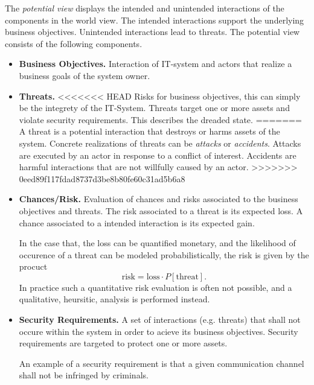 The \emph{potential view} displays the intended and unintended interactions of the components in the world view.
The intended interactions support the underlying business objectives.
Unintended interactions lead to threats.
The potential view consists of the following components.
\begin{itemize}
\item \textbf{Business Objectives.}
Interaction of IT-system and actors that realize a business goals of the system owner.

\item \textbf{Threats.}
<<<<<<< HEAD
Risks for business objectives, this can simply be the integrety of the IT-System.
Threats target one or more assets and violate security requirements.
This describes the dreaded state.
=======
A threat is a potential interaction that destroys or harms assets of the system.
Concrete realizations of threats can be \emph{attacks} or \emph{accidents}.
Attacks are executed by an actor in response to a conflict of interest.
Accidents are harmful interactions that are not willfully caused by an actor.
>>>>>>> 0eed89f117fdad8737d3be8b80fe60c31ad5b6a8

\item \textbf{Chances/Risk.}
Evaluation of chances and risks associated to the business objectives and threats.
The risk associated to a threat is its expected loss.
A chance associated to a intended interaction is its expected gain.

In the case that, the loss can be quantified monetary, and the likelihood of occurence of a threat can
be modeled probabilistically, the risk is given by the procuct
\[ \text{risk} = \text{loss} \cdot P[\text{threat}]. \]
In practice such a quantitative risk evaluation is often not possible, and a qualitative, heursitic, analysis is performed instead.

\item \textbf{Security Requirements.}
A set of interactions (e.g. threats) that shall not occure within the system in order to acieve its business objectives.
Security requirements are targeted to protect one or more assets.

An example of a security requirement is that a given communication channel shall not be infringed by criminals.
\end{itemize}




